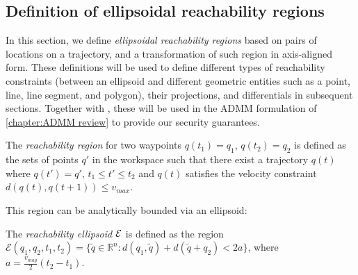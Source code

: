 \documentclass[journal]{IEEEtran}  %
\begin{document}
\subsection{Definition of ellipsoidal reachability regions}\label{sec:reachability}
  In this section, we define  \emph{ellipsoidal reachability regions} based on pairs of locations on a trajectory, and a transformation of such region in axis-aligned form. These definitions will be used to define different types of reachability constraints (between an ellipsoid and different geometric entities such as a point, line, line segment, and polygon), their projections, and differentials in subsequent sections. 
  Together with , these will be used in the ADMM formulation of \cref{chapter:ADMM review} to provide our security guarantees.


\begin{definition}\label{sec:ellipsoidal definition}
	The \emph{reachability region} for two waypoints $q(t_1)=q_1$, $q(t_2)=q_2$ is defined as the sets of points $q'$ in the workspace such that there exist a trajectory $q(t)$ where $q(t')=q'$, $t_1\leq t' \leq t_2$ and $q(t)$ satisfies the velocity constraint $d(q(t),q(t+1))\leq v_{max}$.
\end{definition}
This region can be analytically bounded via an ellipsoid:
\begin{definition}\label{def:Reachability}
	The \emph{reachability ellipsoid $\mathcal{E}$} is defined as the region  $\mathcal{E}(q_1,q_2,t_{1},t_{2})=\{\tilde{q}\in\mathbb{R}^n: d(q_1,\tilde{q})+d(\tilde{q}+q_2)<2a\}$, where $a=\frac{v_{maq}}{2}(t_2-t_1)$.
\end{definition}
\end{document}
